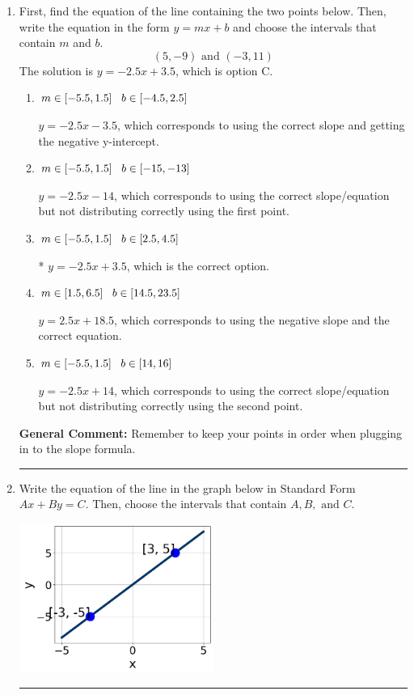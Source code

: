 \documentclass{extbook}[14pt]
\newcommand{\litem}[1]{\item #1

\rule{\textwidth}{0.4pt}}
\begin{document}
\begin{enumerate}\litem{
First, find the equation of the line containing the two points below. Then, write the equation in the form $ y=mx+b $ and choose the intervals that contain $m$ and $b$.
\[ (5, -9) \text{ and } (-3, 11) \]The solution is \( y = -2.5x + 3.5 \), which is option C.\begin{enumerate}[label=\Alph*.]
\item \( m \in [-5.5, 1.5] \hspace*{3mm} b \in [-4.5, 2.5] \)

 $y = -2.5x -3.5$, which corresponds to using the correct slope and getting the negative y-intercept.
\item \( m \in [-5.5, 1.5] \hspace*{3mm} b \in [-15, -13] \)

 $y = -2.5x -14$, which corresponds to using the correct slope/equation but not distributing correctly using the first point.
\item \( m \in [-5.5, 1.5] \hspace*{3mm} b \in [2.5, 4.5] \)

* $y = -2.5x + 3.5$, which is the correct option.
\item \( m \in [1.5, 6.5] \hspace*{3mm} b \in [14.5, 23.5] \)

 $y = 2.5x + 18.5$, which corresponds to using the negative slope and the correct equation.
\item \( m \in [-5.5, 1.5] \hspace*{3mm} b \in [14, 16] \)

 $y = -2.5x + 14$, which corresponds to using the correct slope/equation but not distributing correctly using the second point.
\end{enumerate}

\textbf{General Comment:} Remember to keep your points in order when plugging in to the slope formula.
}
\litem{
Write the equation of the line in the graph below in Standard Form $Ax+By=C$. Then, choose the intervals that contain $A, B, \text{ and } C$.

\begin{center}
    \includegraphics[width=0.5\textwidth]{../Figures/linearGraphToStandardCopyB.png}
\end{center}


}
\end{enumerate}
\end{document}

